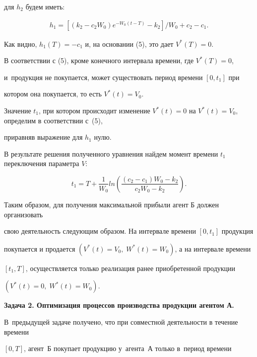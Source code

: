 для $h_2$ будем иметь:

\[

   \begin{aligned}

h_1=\left[(k_2-c_2W_0)e^{-W_0(t-T)}-k_2\right]/W_0+c_2-c_1.

   \end{aligned}

\]



Как видно, $h_1(T)=-c_1$ и, на основании (5), это дает $V^*(T)=0$.

В соответствии с (5), кроме конечного интервала времени, где $V^*(T)=0$,

и~продукция не покупается, может существовать период времени $[0, t_1]$ при

котором она покупается, то есть $V^*(t)=V_0$.

Значение $t_1$, при котором происходит изменение $V^*(t)=0$ на $V^*(t)=V_0$, определим в соответствии с~(5),

приравняв выражение для $h_1$ нулю.

В результате решения полученного уравнения найдем момент времени $t_1$ переключения параметра $V$:

\begin{equation}

\label{f6}

t_1=T+\frac{1}{W_0}ln\left(\frac{(c_2-c_1)W_0-k_2}{c_2W_0-k_2}\right).

\end{equation}



Таким образом, для получения максимальной прибыли агент Б должен организовать

свою деятельность следующим образом. На интервале времени $[0,t_1]$ продукция

покупается и продается $(V^*(t)=V_0,\; W^*(t)=W_0)$, а на интервале времени

$[t_1,T]$, осуществляется только реализация ранее приобретенной продукции

$(V^*(t)=0,\; W^*(t)=W_0)$.



{\bf Задача 2. Оптимизация процессов производства продукции агентом А.}

В~предыдущей задаче получено, что при совместной деятельности в течение времени

$[0, T]$, агент~Б покупает продукцию у~агента~А только в~период времени

